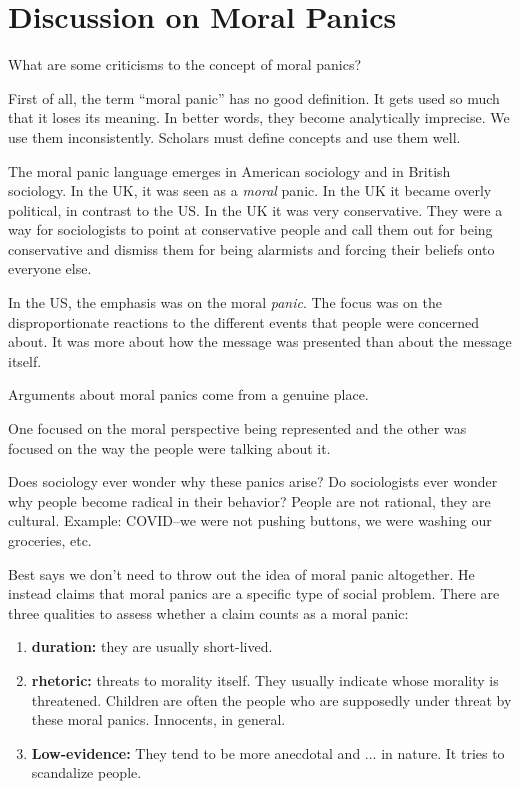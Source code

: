 \section{Discussion on Moral Panics}
What are some criticisms to the concept of moral panics?

First of all, the term ``moral panic'' has no good definition.
It gets used so much that it loses its meaning.
In better words, they become analytically imprecise.
We use them inconsistently.
Scholars must define concepts and use them well.

The moral panic language emerges in American sociology and in British sociology.
In the UK, it was seen as a \textit{moral} panic.
In the UK it became overly political, in contrast to the US.
In the UK it was very conservative.
They were a way for sociologists to point at conservative people and call them out for being conservative and dismiss them for being alarmists and forcing their beliefs onto everyone else.

In the US, the emphasis was on the moral \textit{panic}.
The focus was on the disproportionate reactions to the different events that people were concerned about.
It was more about how the message was presented than about the message itself.

Arguments about moral panics come from a genuine place.

One focused on the moral perspective being represented and the other was focused on the way the people were talking about it.

Does sociology ever wonder why these panics arise?
Do sociologists ever wonder why people become radical in their behavior?
People are not rational, they are cultural.
Example: COVID--we were not pushing buttons, we were washing our groceries, etc.

Best says we don't need to throw out the idea of moral panic altogether.
He instead claims that moral panics are a specific type of social problem.
There are three qualities to assess whether a claim counts as a moral panic:
\begin{enumerate}
    \item \textbf{duration:} they are usually short-lived.
    \item \textbf{rhetoric:} threats to morality itself.
    They usually indicate whose morality is threatened.
    Children are often the people who are supposedly under threat by these moral panics.
    Innocents, in general.
    \item \textbf{Low-evidence:}
    They tend to be more anecdotal and ... in nature.
    It tries to scandalize people.
\end{enumerate}

